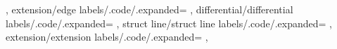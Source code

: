 {        {\unexpanded{}},
    extension/edge labels/.code/.expanded=
        {\unexpanded{}},
    differential/differential labels/.code/.expanded=
        {\unexpanded{}},
    struct line/struct line labels/.code/.expanded=
        {\unexpanded{}},
    extension/extension labels/.code/.expanded=
        {\unexpanded{}},
}





\def\sseq@keys@lastpart{%
    \edef\pgfkeyscurrentkey{\pgfkeyscurrentpath}%
    \pgfkeys@split@path
    \edef\sseq@temp{\pgfkeyscurrentname}%
    \edef\sseq@temp@ii{\pgfkeyscurrentkey}%
}

\def\sseq@sanitize@intexpr#1#2{
    \sseq@ifintexpr{#1}{
        \edef\sseq@sanitize@output{\the\numexpr#1}
    }{
        \sseq@error@xx{invalid-intexpr}{\unexpanded{#2}}{#1}
        \sseq@break
    }
}

\def\sseq@sanitize@positiveintexpr#1#2{
    \sseq@sanitize@intexpr{#1}{#2}
    \ifnum\sseq@sanitize@output<1\relax
        \sseq@error@xx{invalid-positive-intexpr}{\unexpanded{#2}}{#1}
        \@xp\sseq@break
    \fi
}

\def\sseq@sanitize@dimenexpr#1#2{
    \sseq@ifpgfmathexpr{#1}{
        \ifpgfmathunitsdeclared\else
            \sseq@error@xx{invalid-dimenexpr}{\unexpanded{#2}}{#1}
            \@xp\sseq@break
        \fi
        \edef\sseq@sanitize@output{\sseq@mathresult}
    }{
        \sseq@error@xx{invalid-dimenexpr}{\unexpanded{#2}}{#1}
        \sseq@break
    }
}

\def\sseq@sanitize@color#1#2{
    \begingroup
        \global\sseq@gtempiffalse
        \def\c@lor@error##1{\global\sseq@gtempiftrue}
        \color{#1}
    \endgroup
    \ifsseq@gtempif
        \sseq@error@xx{invalid-color}{\unexpanded{#2}}{#1}
        \@xp\sseq@break
    \else
        \def\sseq@sanitize@output{#1}
    \fi
}

